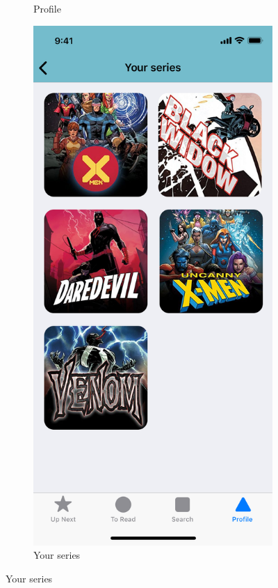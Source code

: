 \begin{figure}[p]
\begin{subfigure}[b]{0.4\textwidth}
    \caption{Profile}
    \label{fig:1}
  \end{subfigure}
  \hfill
  \begin{subfigure}[b]{0.4\textwidth}
    \includegraphics[width=\textwidth]{img/mockups/your_series}
    \caption{Your series}
    \label{fig:2}
  \end{subfigure}
\end{figure}

